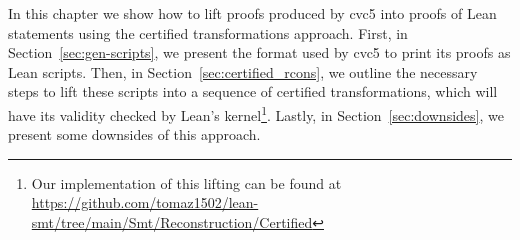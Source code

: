 In this chapter we show how to lift proofs produced by cvc5 into
proofs of Lean statements using the certified transformations approach.
First, in Section~\ref{sec:gen-scripts}, we present the format used by
cvc5 to print its proofs as Lean scripts.
Then, in Section~\ref{sec:certified_rcons}, we outline the necessary
steps to lift these scripts into a sequence of certified transformations,
which will have its validity checked by Lean's kernel\footnote{Our implementation of this lifting can be found at \url{https://github.com/tomaz1502/lean-smt/tree/main/Smt/Reconstruction/Certified}}.
Lastly, in Section~\ref{sec:downsides}, we present some downsides of this approach.
